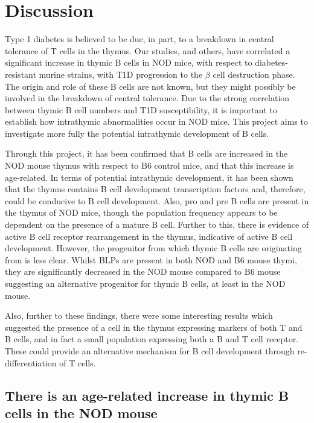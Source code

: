 
\chapter{Discussion}

Type 1 diabetes is believed to be due, in part, to a breakdown in central tolerance of T cells in the thymus.
Our studies, and others, have correlated a significant increase in thymic B cells in NOD mice, with respect to diabetes-resistant murine strains, with T1D progression to the $\beta$ cell destruction phase.
The origin and role of these B cells are not known, but they might possibly be involved in the breakdown of central tolerance.
Due to the strong correlation between thymic B cell numbers and T1D susceptibility, it is important to establish how intrathymic abnormalities occur in NOD mice.
This project aims to investigate more fully the potential intrathymic development of B cells.

Through this project, it has been confirmed that B cells are increased in the NOD mouse thymus with respect to B6 control mice, and that this increase is age-related.
In terms of potential intrathymic development, it has been shown that the thymus contains B cell development transcription factors and, therefore, could be conducive to B cell development.
Also, pro and pre B cells are present in the thymus of NOD mice, though the population frequency appears to be dependent on the presence of a mature B cell.
Further to this, there is evidence of active B cell receptor rearrangement in the thymus, indicative of active B cell development.
However, the progenitor from which thymic B cells are originating from is less clear. 
Whilst BLPs are present in both NOD and B6 mouse thymi, they are significantly decreased in the NOD mouse compared to B6 mouse suggesting an alternative progenitor for thymic B cells, at least in the NOD mouse.

Also, further to these findings, there were some interesting results which suggested the presence of a cell in the thymus expressing markers of both T and B cells, and in fact a small population expressing both a B and T cell receptor.
These could provide an alternative mechanism for B cell development through re-differentiation of T cells.


\section{There is an age-related increase in thymic B cells in the NOD mouse}

